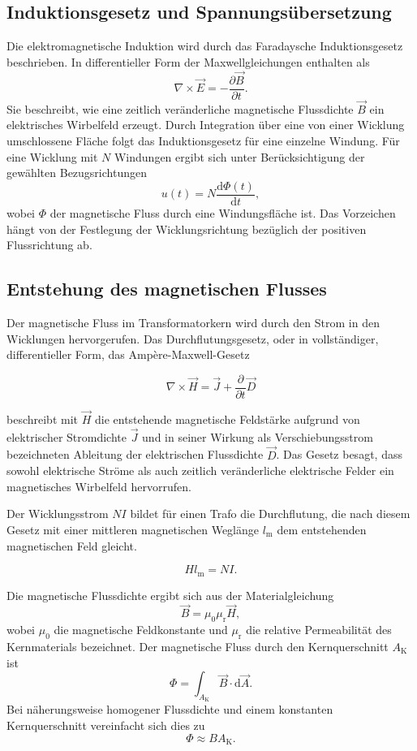 \subsection{Induktionsgesetz und Spannungsübersetzung}

Die elektromagnetische Induktion wird durch das Faradaysche
Induktionsgesetz beschrieben. In differentieller Form der
Maxwellgleichungen enthalten als
\[
    \nabla \times \vec{E}
    = -\frac{\partial \vec{B}}{\partial t}.
\]
Sie beschreibt, wie eine zeitlich veränderliche magnetische
Flussdichte $\vec{B}$ ein elektrisches Wirbelfeld erzeugt.
Durch Integration über eine von
einer Wicklung umschlossene Fläche folgt das Induktionsgesetz für
eine einzelne Windung. Für eine Wicklung mit $N$ Windungen ergibt
sich unter Berücksichtigung der gewählten Bezugsrichtungen
\[
    u(t) = N \frac{\mathrm d\Phi(t)}{\mathrm dt},
\]
wobei $\Phi$ der magnetische Fluss durch eine Windungsfläche ist.
Das Vorzeichen hängt von der Festlegung der Wicklungsrichtung bezüglich
der positiven Flussrichtung ab.

\subsection{Entstehung des magnetischen Flusses}

Der magnetische Fluss im Transformatorkern wird durch den Strom
in den Wicklungen hervorgerufen. Das Durchflutungsgesetz, oder
in vollständiger, differentieller Form, das
Ampère-Maxwell-Gesetz

\[
        \nabla \times \vec{H}
        = \vec{J} + \frac{\partial}{\partial t} \vec{D}
\]

beschreibt mit $\vec{H}$ die entstehende magnetische Feldstärke
aufgrund von elektrischer Stromdichte $\vec{J}$ und in seiner
Wirkung als Verschiebungsstrom bezeichneten Ableitung der elektrischen Flussdichte $\vec{D}$. Das
Gesetz besagt, dass sowohl elektrische Ströme als auch zeitlich veränderliche
elektrische Felder ein magnetisches Wirbelfeld hervorrufen.

Der Wicklungsstrom $N I$ bildet für einen Trafo die Durchflutung,
die nach diesem Gesetz mit einer mittleren
magnetischen Weglänge $l_\mathrm{m}$ dem entstehenden magnetischen Feld gleicht.

\[
    H l_\mathrm{m} = N I.
\]

Die magnetische Flussdichte ergibt sich aus der Materialgleichung
\[
    \vec{B} = \mu_0 \mu_\mathrm{r}\vec{H},
\]
wobei $\mu_0$ die magnetische Feldkonstante und $\mu_\mathrm{r}$
die relative Permeabilität des Kernmaterials bezeichnet. Der
magnetische Fluss durch den Kernquerschnitt $A_\mathrm{K}$ ist
\[
    \Phi = \int_{A_\mathrm{K}} \vec{B}\cdot \mathrm d\vec{A}.
\]
Bei näherungsweise homogener Flussdichte und einem konstanten
Kernquerschnitt vereinfacht sich dies zu
\[
    \Phi \approx B A_\mathrm{K}.
\]

